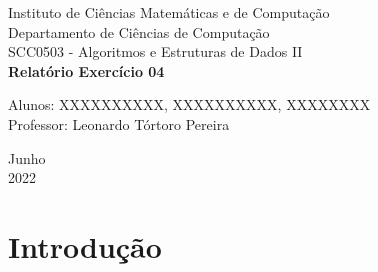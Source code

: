 \documentclass[a4paper, 12pt]{article}
\begin{document}

\begin{titlepage}
	\begin{center}
	

		\Huge{Instituto de Ciências Matemáticas e de Computação}\\
		\large{Departamento de Ciências de Computação}\\ 
		\large{SCC0503 - Algoritmos e Estruturas de Dados II}\\ 
		\vspace{15pt}
        \vspace{95pt}
        \textbf{\LARGE{Relatório Exercício 04}}\\
		\vspace{3,5cm}
	\end{center}
	
	\begin{flushleft}
		\begin{tabbing}
			Alunos: XXXXXXXXXX, XXXXXXXXXX, XXXXXXXX\\
			Professor: Leonardo Tórtoro Pereira\\
	\end{tabbing}
 \end{flushleft}
	\vspace{1cm}
	
	\begin{center}
		\vspace{\fill}
			 Junho\\
		 2022
			\end{center}
\end{titlepage}

\newpage
\newpage
\tableofcontents
\thispagestyle{empty}

\newpage
{}
\section{Introdução}
\end{document}
